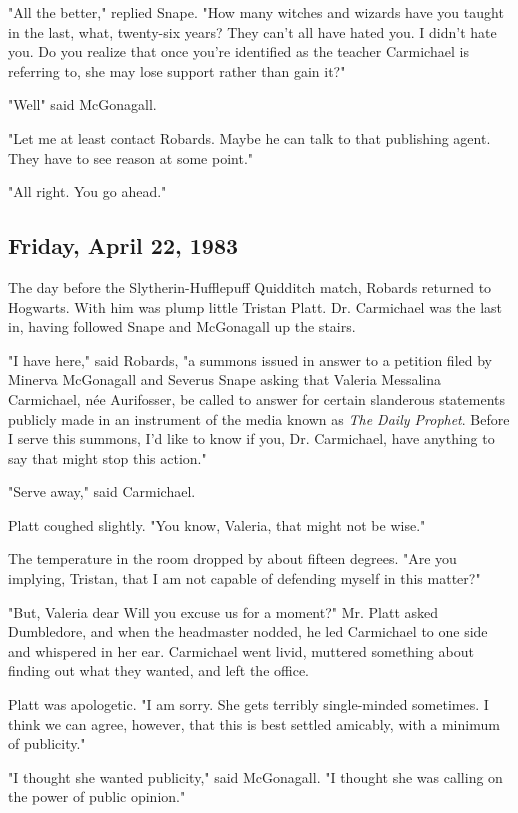"All the better," replied Snape. "How many witches and wizards have you taught in the last, what, twenty-six years? They can't all have hated you. I didn't hate you. Do you realize that once you're identified as the teacher Carmichael is referring to, she may lose support rather than gain it?"

"Well{\el}" said McGonagall.

"Let me at least contact Robards. Maybe he can talk to that publishing agent. They have to see reason at some point."

"All right. You go ahead."

\subsection{Friday, April 22, 1983}

The day before the Slytherin-Hufflepuff Quidditch match, Robards returned to Hogwarts. With him was plump little Tristan Platt. Dr. Carmichael was the last in, having followed Snape and McGonagall up the stairs.

"I have here," said Robards, "a summons issued in answer to a petition filed by Minerva McGonagall and Severus Snape asking that Valeria Messalina Carmichael, née Aurifosser, be called to answer for certain slanderous statements publicly made in an instrument of the media known as \emph{The Daily Prophet}. Before I serve this summons, I'd like to know if you, Dr. Carmichael, have anything to say that might stop this action."

"Serve away," said Carmichael.

Platt coughed slightly. "You know, Valeria, that might not be wise."

The temperature in the room dropped by about fifteen degrees. "Are you implying, Tristan, that I am not capable of defending myself in this matter?"

"But, Valeria dear{\el} Will you excuse us for a moment?" Mr. Platt asked Dumbledore, and when the headmaster nodded, he led Carmichael to one side and whispered in her ear. Carmichael went livid, muttered something about finding out what they wanted, and left the office.

Platt was apologetic. "I am sorry. She gets terribly single-minded sometimes. I think we can agree, however, that this is best settled amicably, with a minimum of publicity."

"I thought she wanted publicity," said McGonagall. "I thought she was calling on the power of public opinion."

